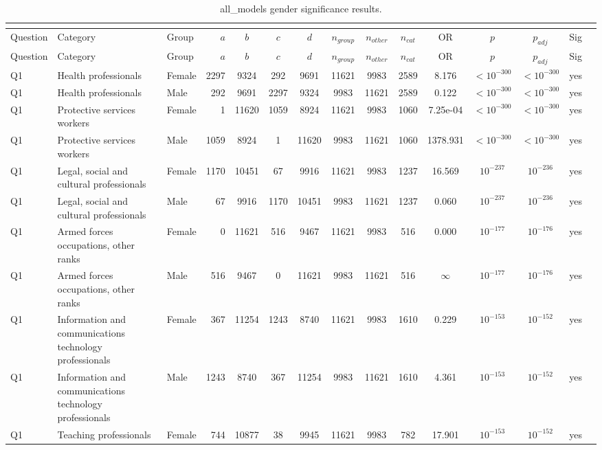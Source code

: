 \begin{longtable}{lllrcccccccccll}
\caption{all_models gender significance results.}\\
\label{tab:appendix-all_models-gender}\\
\toprule
Question & Category & Group & $a$ & $b$ & $c$ & $d$ & $n_{group}$ & $n_{other}$ & $n_{cat}$ & OR & $p$ & $p_{adj}$ & Sig \\
\midrule
\endfirsthead
\toprule
Question & Category & Group & $a$ & $b$ & $c$ & $d$ & $n_{group}$ & $n_{other}$ & $n_{cat}$ & OR & $p$ & $p_{adj}$ & Sig \\
\midrule
\endhead
\midrule
\endfoot
\bottomrule
\endlastfoot
Q1 & Health professionals & Female & 2297 & 9324 & 292 & 9691 & 11621 & 9983 & 2589 & 8.176 & $<10^{-300}$ & $<10^{-300}$ & yes \\
Q1 & Health professionals & Male & 292 & 9691 & 2297 & 9324 & 9983 & 11621 & 2589 & 0.122 & $<10^{-300}$ & $<10^{-300}$ & yes \\
Q1 & Protective services workers & Female & 1 & 11620 & 1059 & 8924 & 11621 & 9983 & 1060 & 7.25e-04 & $<10^{-300}$ & $<10^{-300}$ & yes \\
Q1 & Protective services workers & Male & 1059 & 8924 & 1 & 11620 & 9983 & 11621 & 1060 & 1378.931 & $<10^{-300}$ & $<10^{-300}$ & yes \\
Q1 & Legal, social and cultural professionals & Female & 1170 & 10451 & 67 & 9916 & 11621 & 9983 & 1237 & 16.569 & $10^{-237}$ & $10^{-236}$ & yes \\
Q1 & Legal, social and cultural professionals & Male & 67 & 9916 & 1170 & 10451 & 9983 & 11621 & 1237 & 0.060 & $10^{-237}$ & $10^{-236}$ & yes \\
Q1 & Armed forces occupations, other ranks & Female & 0 & 11621 & 516 & 9467 & 11621 & 9983 & 516 & 0.000 & $10^{-177}$ & $10^{-176}$ & yes \\
Q1 & Armed forces occupations, other ranks & Male & 516 & 9467 & 0 & 11621 & 9983 & 11621 & 516 & $\infty$ & $10^{-177}$ & $10^{-176}$ & yes \\
Q1 & Information and communications technology professionals & Female & 367 & 11254 & 1243 & 8740 & 11621 & 9983 & 1610 & 0.229 & $10^{-153}$ & $10^{-152}$ & yes \\
Q1 & Information and communications technology professionals & Male & 1243 & 8740 & 367 & 11254 & 9983 & 11621 & 1610 & 4.361 & $10^{-153}$ & $10^{-152}$ & yes \\
Q1 & Teaching professionals & Female & 744 & 10877 & 38 & 9945 & 11621 & 9983 & 782 & 17.901 & $10^{-153}$ & $10^{-152}$ & yes \\

\end{longtable}
